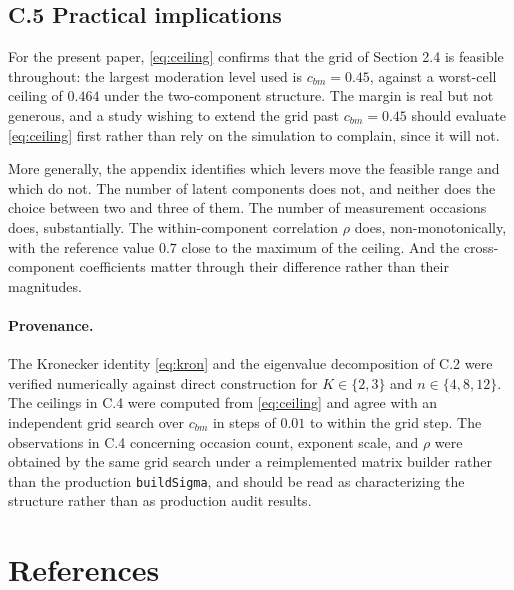 \documentclass[
  11pt,
]{article}
\begin{document}
\subsection{C.5 Practical implications}

For the present paper, \eqref{eq:ceiling} confirms that the grid of
Section 2.4 is feasible throughout: the largest moderation level used
is \(c_{bm} = 0.45\), against a worst-cell ceiling of \(0.464\) under the
two-component structure. The margin is real but not generous, and a
study wishing to extend the grid past \(c_{bm} = 0.45\) should evaluate
\eqref{eq:ceiling} first rather than rely on the simulation to
complain, since it will not.

More generally, the appendix identifies which levers move the
feasible range and which do not. The number of latent components does
not, and neither does the choice between two and three of them. The
number of measurement occasions does, substantially. The
within-component correlation \(\rho\) does, non-monotonically, with the
reference value \(0.7\) close to the maximum of the ceiling. And the
cross-component coefficients matter through their difference rather
than their magnitudes.

\paragraph{Provenance.}

The Kronecker identity \eqref{eq:kron} and
the eigenvalue decomposition of C.2 were verified numerically against
direct construction for \(K \in \{2,3\}\) and \(n \in \{4,8,12\}\). The
ceilings in C.4 were computed from \eqref{eq:ceiling} and agree with
an independent grid search over \(c_{bm}\) in steps of \(0.01\) to within
the grid step. The observations in C.4 concerning occasion count,
exponent scale, and \(\rho\) were obtained by the same grid search
under a reimplemented matrix builder rather than the production
\texttt{buildSigma}, and should be read as characterizing the
structure rather than as production audit results.

\section{References}\label{references}
\end{document}
